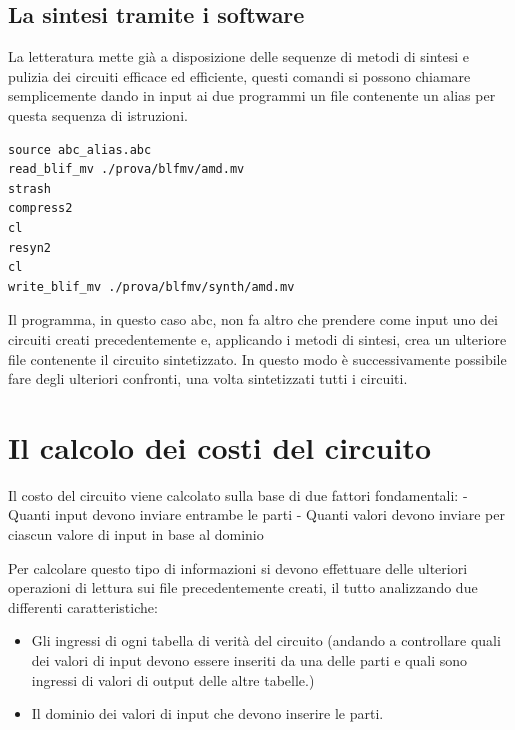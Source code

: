 \documentclass[
  italian,
]{book}
\providecommand{\tightlist}{%
  \setlength{\itemsep}{0pt}\setlength{\parskip}{0pt}}
\begin{document}
\hypertarget{la-sintesi-tramite-i-software}{%
\subsection{La sintesi tramite i software}\label{la-sintesi-tramite-i-software}}

La letteratura mette già a disposizione delle sequenze di metodi di sintesi e pulizia dei circuiti efficace ed efficiente, questi comandi si possono chiamare semplicemente dando in input ai due programmi un file contenente un alias per questa sequenza di istruzioni.

\begin{verbatim}
source abc_alias.abc
read_blif_mv ./prova/blfmv/amd.mv
strash
compress2
cl
resyn2
cl
write_blif_mv ./prova/blfmv/synth/amd.mv
\end{verbatim}

Il programma, in questo caso abc, non fa altro che prendere come input uno dei circuiti creati precedentemente e, applicando i metodi di sintesi, crea un ulteriore file contenente il circuito sintetizzato. In questo modo è successivamente possibile fare degli ulteriori confronti, una volta sintetizzati tutti i circuiti.

\hypertarget{il-calcolo-dei-costi-del-circuito}{%
\section{Il calcolo dei costi del circuito}\label{il-calcolo-dei-costi-del-circuito}}

Il costo del circuito viene calcolato sulla base di due fattori fondamentali:
- Quanti input devono inviare entrambe le parti
- Quanti valori devono inviare per ciascun valore di input in base al dominio

Per calcolare questo tipo di informazioni si devono effettuare delle ulteriori operazioni di lettura sui file precedentemente creati, il tutto analizzando due differenti caratteristiche:

\begin{itemize}
\tightlist
\item
  Gli ingressi di ogni tabella di verità del circuito (andando a controllare quali dei valori di input devono essere inseriti da una delle parti e quali sono ingressi di valori di output delle altre tabelle.)
\item
  Il dominio dei valori di input che devono inserire le parti.
\end{itemize}
\end{document}
